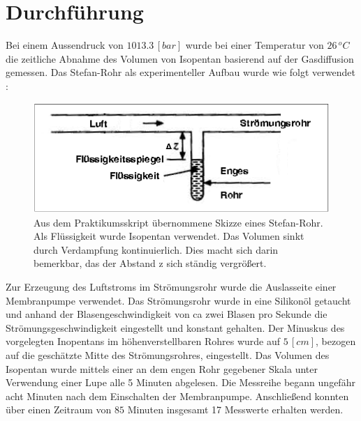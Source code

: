 %
%
\section{Durchführung}
Bei einem Aussendruck von $1013.3\,[\si{bar}]$ wurde bei einer Temperatur von $26\,\si{^oC}$ die zeitliche Abnahme des Volumen von Isopentan basierend auf der Gasdiffusion gemessen. Das Stefan-Rohr als experimenteller Aufbau wurde wie folgt verwendet : 


\begin{figure}[H]

\centering
\includegraphics[width=0.8\linewidth]{stefanrohr.png}
\caption{Aus dem Praktikumsskript übernommene Skizze eines Stefan-Rohr. Als Flüssigkeit wurde Isopentan verwendet. Das Volumen sinkt durch Verdampfung kontinuierlich. Dies macht sich darin bemerkbar, das der Abstand z sich ständig vergrößert.}
\end{figure}

Zur Erzeugung des Luftstroms im Strömungsrohr wurde die Auslasseite einer Membranpumpe verwendet. Das Strömungsrohr wurde in eine Silikonöl getaucht und anhand der  Blasengeschwindigkeit von ca zwei Blasen pro Sekunde die Strömungsgeschwindigkeit eingestellt und konstant gehalten. Der Minuskus des vorgelegten Inopentans im höhenverstellbaren Rohres wurde auf $5\,[\si{cm}]$, bezogen auf die geschätzte Mitte des Strömungsrohres, eingestellt.  Das Volumen des Isopentan wurde mittels einer an dem engen Rohr gegebener Skala unter Verwendung einer Lupe alle 5 Minuten abgelesen. Die Messreihe begann ungefähr acht Minuten nach dem Einschalten der Membranpumpe. Anschließend konnten über einen Zeitraum von $85$ Minuten insgesamt 17 Messwerte erhalten werden.
\newpage
%
